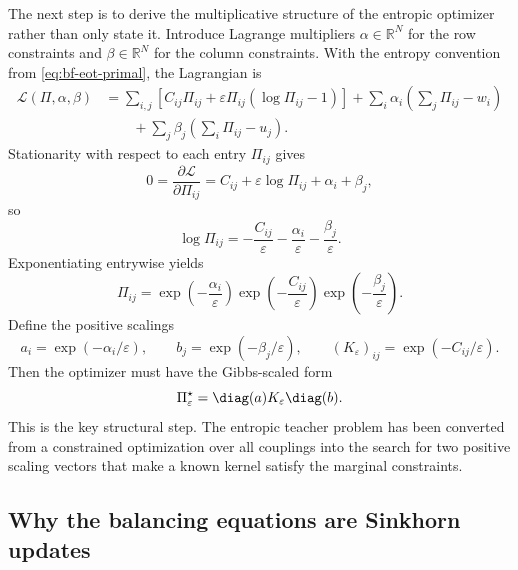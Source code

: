 The next step is to derive the multiplicative structure of the entropic optimizer
rather than only state it.  Introduce Lagrange multipliers \(\alpha\in\mathbb R^N\)
for the row constraints and \(\beta\in\mathbb R^N\) for the column constraints.
With the entropy convention from \eqref{eq:bf-eot-primal}, the Lagrangian is
\begin{align}
\label{eq:bf-eot-lagrangian}
  \mathcal L(\Pi,\alpha,\beta)
  &=
  \sum_{i,j}
  \left[
    C_{ij}\Pi_{ij}
    + \varepsilon \Pi_{ij}(\log\Pi_{ij}-1)
  \right]
  + \sum_i \alpha_i\left(\sum_j\Pi_{ij}-w_i\right) \\
  &\qquad
  + \sum_j \beta_j\left(\sum_i\Pi_{ij}-u_j\right).
\end{align}
Stationarity with respect to each entry \(\Pi_{ij}\) gives
\begin{equation}
\label{eq:bf-eot-stationarity}
  0
  =
  \frac{\partial \mathcal L}{\partial \Pi_{ij}}
  =
  C_{ij}
  + \varepsilon \log \Pi_{ij}
  + \alpha_i + \beta_j,
\end{equation}
so
\begin{equation}
\label{eq:bf-eot-log-pi}
  \log\Pi_{ij}
  =
  -\frac{C_{ij}}{\varepsilon}
  -\frac{\alpha_i}{\varepsilon}
  -\frac{\beta_j}{\varepsilon}.
\end{equation}
Exponentiating entrywise yields
\begin{equation}
\label{eq:bf-eot-entrywise-factorization}
  \Pi_{ij}
  =
  \exp\!\left(-\frac{\alpha_i}{\varepsilon}\right)
  \exp\!\left(-\frac{C_{ij}}{\varepsilon}\right)
  \exp\!\left(-\frac{\beta_j}{\varepsilon}\right).
\end{equation}
Define the positive scalings
\begin{equation}
\label{eq:bf-eot-scaling-definitions}
  a_i = \exp(-\alpha_i/\varepsilon),
  \qquad
  b_j = \exp(-\beta_j/\varepsilon),
  \qquad
  (K_\varepsilon)_{ij}=\exp(-C_{ij}/\varepsilon).
\end{equation}
Then the optimizer must have the Gibbs-scaled form
\begin{equation}
\label{eq:bf-eot-factorization}
  \Pi_\varepsilon^\star
  =
  \diag(a)K_\varepsilon\diag(b).
\end{equation}
This is the key structural step.  The entropic teacher problem has been converted
from a constrained optimization over all couplings into the search for two positive
scaling vectors that make a known kernel satisfy the marginal constraints.

\subsection{Why the balancing equations are Sinkhorn updates}
\label{sec:bf-eot-balancing-equations}


